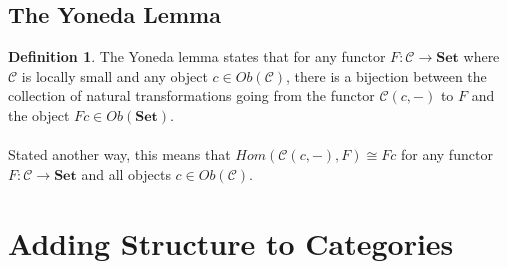 \documentclass{article}
\theoremstyle{definition}
\newtheorem{definition}{Definition}
\begin{document}
\subsection*{The Yoneda Lemma}
\begin{definition}
    The Yoneda lemma states that for any functor $F:\mathcal{C}\rightarrow\mathbf{Set}$ where $\mathcal{C}$ is locally small and any object $c\in Ob(\mathcal{C})$, there is a bijection between the collection of natural transformations going from the functor $\mathcal{C}(c,-)$ to $F$ and the object $Fc\in Ob(\mathbf{Set})$.
    \\\\Stated another way, this means that $Hom(\mathcal{C}(c,-), F)\cong Fc$ for any functor $F:\mathcal{C}\rightarrow\mathbf{Set}$ and all objects $c\in Ob(\mathcal{C})$.

\end{definition}


\section*{Adding Structure to Categories}
\end{document}
